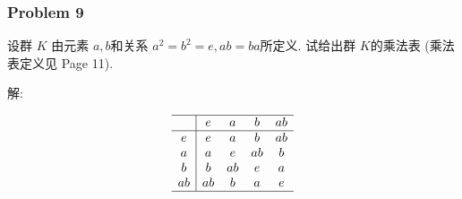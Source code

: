 \documentclass[a4paper,12pt]{ctexart}
\begin{document}
\subsubsection*{Problem 9}
  设群 $ K $ 由元素 $ a,b $和关系 $ a^2=b^2=e,ab=ba $所定义. 试给出群 $ K $的乘法表 (乘法表定义见 Page 11).

  解:

  \[\begin{array}{c|cccc}
    \hline 
       & e  & a  & b  & ab \\
    \hline    
    e  & e  & a  & b  & ab \\
    a  & a  & e  & ab & b  \\
    b  & b  & ab & e  & a  \\
    ab & ab & b  & a  & e  \\
    \hline
    \end{array}\]
\end{document}
